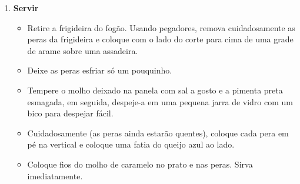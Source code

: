 \documentclass [11pt, letterpaper] {article}
\begin{document}
\begin {description}
\begin {enumerate}
\item {\bf Servir}
\begin {itemize}
\item Retire a frigideira do fog\~ao. Usando pegadores, remova cuidadosamente as peras da frigideira e coloque com o lado do corte para cima de uma grade de arame sobre uma assadeira.
\item Deixe as peras esfriar s\'o um pouquinho.
\item Tempere o molho deixado na panela com sal a gosto e a pimenta preta esmagada, em seguida, despeje-a em uma pequena jarra de vidro com um bico para despejar f\'acil.
\item Cuidadosamente (as peras ainda estarão quentes), coloque cada pera em pé na vertical e coloque uma fatia do queijo azul ao lado.
\item Coloque fios do molho de caramelo no prato e nas peras. Sirva imediatamente.
\end {itemize}

\end {enumerate}
\end {description}
\end{document}
